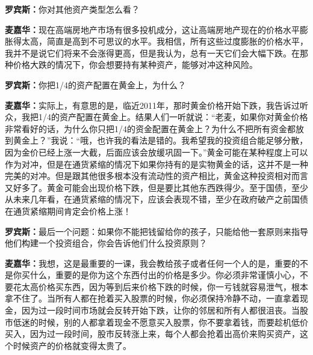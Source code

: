 \begin{BookQuote}
\textbf{罗宾斯：}你对其他资产类型怎么看？
\end{BookQuote}

\begin{BookQuote}
\textbf{麦嘉华：}现在高端房地产市场有很多投机成分，这让高端房地产现在的价格水平膨胀得太高，简直是高到不可思议的水平。我相信，所有这些过度膨胀的价格水平，我并不是说它们将来不会涨得更高，但是我认为，总有一天它们会大幅下跌。在那种价格大跌的情况下，你会想要持有某种资产，能够对冲这种风险。
\end{BookQuote}

\begin{BookQuote}
\textbf{罗宾斯：}你把1/4的资产配置在黄金上，为什么？
\end{BookQuote}

\begin{BookQuote}
\textbf{麦嘉华：}实际上，有意思的是，临近2011年，那时黄金价格开始下跌，我告诉过听众，我把1/4的资产配置在黄金上。结果人们一听就说：“老麦，如果你对黄金价格非常看好的话，为什么你只把1/4的资金配置在黄金上？为什么不把所有资金都放到黄金上？”我说：“哦，也许我的看法是错的。我希望我的投资组合能足够分散，因为金价已经上涨一大截，后面应该会放缓巩固一下。”黄金可能在某种程度上可以作为对冲，但是在通货紧缩的情况下如果你持有的是实物黄金的话，这并不是一种完美的对冲。但是跟其他很多根本没有流动性的资产相比，黄金这种投资相对而言又好多了。黄金可能会出现价格下跌，但是要比其他东西跌得少。至于国债，至少从未来几年看，在通货紧缩的情况下，应该会表现不错，至少在政府破产之前国债在通货紧缩期间肯定会价格上涨！
\end{BookQuote}

\begin{BookQuote}
\textbf{罗宾斯：}最后一个问题：如果你不能把钱留给你的孩子，只能给他一套原则来指导他们构建一个投资组合，你会告诉他们什么投资原则？
\end{BookQuote}

\begin{BookQuote}
\textbf{麦嘉华：}我想，这是最重要的一课，我会教给孩子或者任何一个人的是，重要的不是你买什么，重要的是你为这个东西付出的价格是多少。你必须非常谨慎小心，不要花太高价格买东西，因为等到后来价格下跌的时候，你一亏钱就容易泄气，根本拿不住了。当所有人都在抢着买入股票的时候，你必须保持冷静不动，一直拿着现金，因为过一段时间市场就会反转开始下跌，让你的邻居和所有人都很沮丧。当股市低迷的时候，别的人都拿着现金不愿意买入股票，你不要拿着钱，而要趁机低价买入，因为过一段时间，股市反转涨上来，每个人都会抢着出高价来购买资产，这个时候资产的价格就变得太贵了。
\end{BookQuote}

